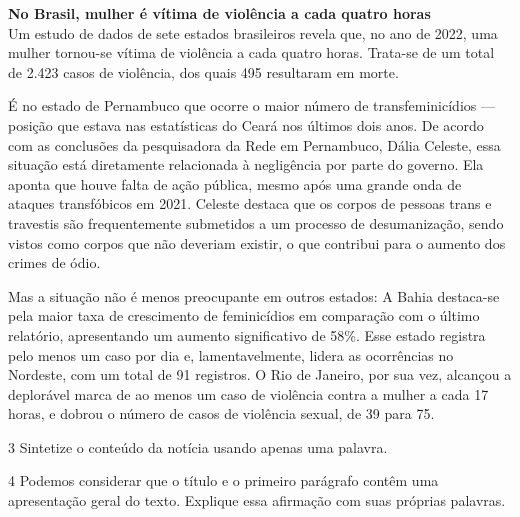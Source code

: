 \begin{myquote}

\textbf{No Brasil, mulher é vítima de violência a cada quatro horas} \\

Um estudo de dados de sete estados brasileiros revela que, no ano de
2022, uma mulher tornou-se vítima de violência a cada quatro horas. Trata-se de 
um total de 2.423 casos de violência, dos quais 495 resultaram em morte.

É no estado de Pernambuco que ocorre o maior número de transfeminicídios ---
posição que estava nas estatísticas do Ceará nos últimos dois anos. De acordo 
com as conclusões da pesquisadora da Rede em Pernambuco, Dália Celeste, essa 
situação está diretamente relacionada à negligência por parte do governo. Ela 
aponta que houve falta de ação pública, mesmo
após uma grande onda de ataques transfóbicos em 2021. Celeste
destaca que os corpos de pessoas trans e travestis são frequentemente
submetidos a um processo de desumanização, sendo vistos como corpos que não
deveriam existir, o que contribui para o aumento dos crimes de ódio.

Mas a situação não é menos preocupante em outros estados: A Bahia destaca-se 
pela maior taxa de crescimento de feminicídios em comparação com o último relatório, 
apresentando um aumento significativo de 58\%. Esse estado registra pelo 
menos um caso por dia e, lamentavelmente, lidera as ocorrências no Nordeste, 
com um total de 91 registros. O Rio de Janeiro, por sua vez, alcançou a deplorável marca de
ao menos um caso de violência contra a mulher a cada 17 horas, e dobrou 
o número de casos de violência sexual, de 39 para 75.


\end{myquote}

\num{3} Sintetize o conteúdo da notícia usando apenas uma palavra. 


\num{4} Podemos considerar que o título e o primeiro parágrafo contêm uma apresentação 
geral do texto. Explique essa afirmação com suas próprias palavras.

